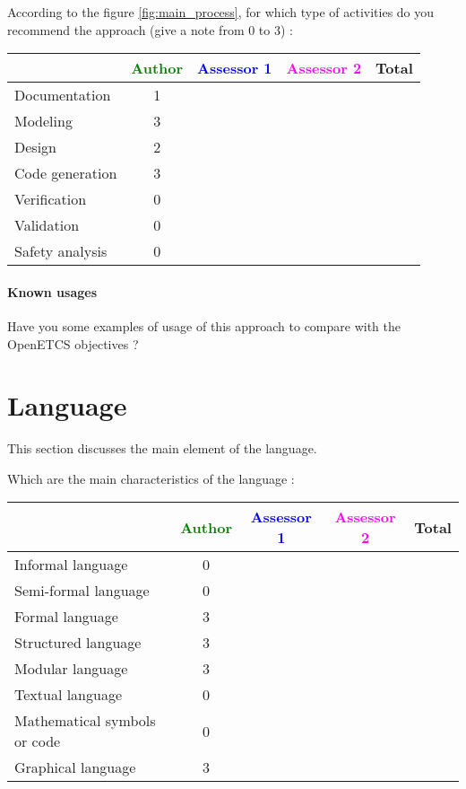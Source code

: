 According to the figure \ref{fig:main_process}, for which type of activities do you recommend the approach (give a note from 0 to  3) :

\begin{tabular}{|l | c | c | c | c|}
\hline
& \textcolor{green}{Author} & \textcolor{blue}{Assessor 1} & \textcolor{magenta}{Assessor 2} & Total \\
\hline 
Documentation &1 & & &  \\
\hline
Modeling &3 & & &  \\
\hline
Design &2 & & & \\
\hline
Code generation &3 & & & \\
\hline
Verification &0 & & & \\
\hline
Validation &0 & & & \\
\hline
Safety analysis &0 & & & \\
\hline
\end{tabular}

\paragraph{Known usages} Have you some examples of usage of this approach to  compare with the OpenETCS objectives ?

\section{Language}
This section discusses the main element of the language.

Which are the main characteristics of the language :

\begin{tabular}{|l | c | c | c | c|}
  \hline
  & \textcolor{green}{Author} & \textcolor{blue}{Assessor 1} & \textcolor{magenta}{Assessor 2} & Total \\
  \hline 
  Informal language &0 & & &  \\
  \hline 
  Semi-formal language &0 & & &  \\
  \hline
  Formal language &3 & & &  \\
  \hline
  Structured language &3 & & & \\
  \hline
  Modular language &3 & & & \\
  \hline
  Textual language &0 & & & \\
  \hline
  Mathematical symbols or code &0 & & & \\
  \hline
  Graphical language &3 & & & \\
  \hline
\end{tabular}


